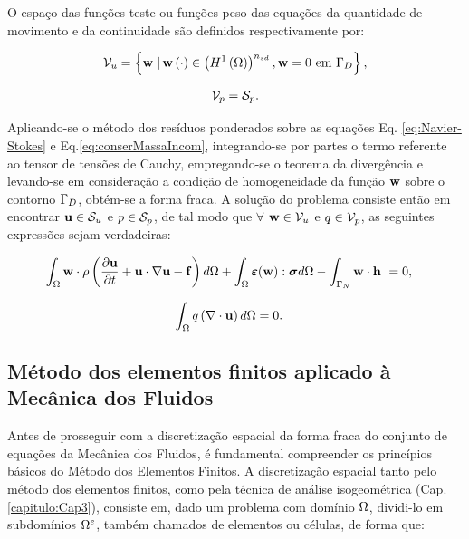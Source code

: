 \documentclass[tese_patricia]{subfiles}%
\begin{document}
O espaço das funções teste ou funções peso das equações da quantidade de movimento e da continuidade são definidos respectivamente por:

\begin{align}
\mathcal{V}_u = \left\{\mathbf{w} \left . \right| \mathbf{w} \left(\cdot\right) \in \left(H^{1}\left(\Omega\right)\right)^{n_{sd}}, \mathbf{w} = 0 \textrm { em} \ \Gamma_{D} \right\},
\end{align}


\begin{align}
\mathcal{V}_p = \mathcal{S}_p.
\end{align}

Aplicando-se o método dos resíduos ponderados sobre as equações Eq. \eqref{eq:Navier-Stokes} e Eq.\eqref{eq:conserMassaIncom}, integrando-se por partes o termo referente ao tensor de tensões de Cauchy, empregando-se o teorema da divergência e levando-se em consideração a condição de homogeneidade da função $\mathbf{w}$ sobre o contorno $\Gamma_D$, obtém-se a forma fraca. A solução do problema consiste então em encontrar $\mathbf{u} \in \mathcal{S}_u$ e $p \in \mathcal{S}_p$, de tal modo que $\forall$ $\mathbf{w} \in \mathcal{V}_u$ e $q \in \mathcal{V}_p$, as seguintes expressões sejam verdadeiras:


\begin{align}
\int_{\Omega} \mathbf{w} \cdot \rho  \left(\frac{\partial\mathbf{u}}{\partial t}  + \mathbf{u}\cdot\nabla\mathbf{u} - \mathbf{f} \right) d\Omega + \int_{\Omega} \bm{\varepsilon}(\mathbf{w}) : \boldsymbol{\sigma}  d\Omega - \int_{\Gamma_{N}} \mathbf{w} \cdot \mathbf{h} \  &= 0,  \label{eq:NSWeakForm1} 
\end{align}

\begin{align}
\int_{\Omega} q \left(\nabla \cdot \mathbf{u}\right) d \Omega &= 0. \label{eq:CWeakForm1} 
\end{align}


\subsection{Método dos elementos finitos aplicado à Mecânica dos Fluidos}

Antes de prosseguir com a discretização espacial da forma fraca do conjunto de equações da Mecânica dos Fluidos, é fundamental compreender os princípios básicos do Método dos Elementos Finitos.  A discretização espacial tanto pelo método dos elementos finitos, como pela técnica de análise isogeométrica (Cap. \ref{capitulo:Cap3}), consiste em, dado um problema com domínio $\Omega$, dividi-lo em subdomínios $\Omega^{e}$, também chamados de elementos ou células, de forma que:
\end{document}
